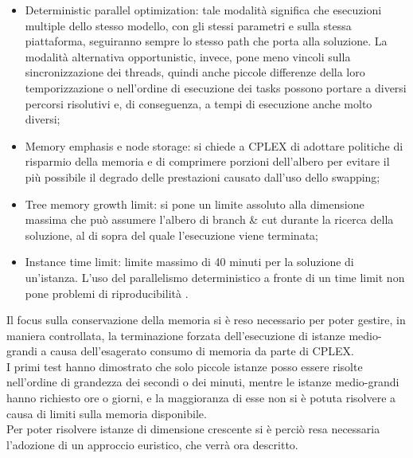 \begin{itemize}
	\item Deterministic parallel optimization: tale modalità significa che esecuzioni multiple dello stesso modello, con gli stessi parametri e sulla stessa piattaforma, seguiranno sempre lo stesso path che porta alla soluzione. La modalità alternativa opportunistic, invece, pone meno vincoli sulla sincronizzazione dei threads, quindi anche piccole differenze della loro temporizzazione o nell'ordine di esecuzione dei tasks possono portare a diversi percorsi risolutivi e, di conseguenza, a tempi di esecuzione anche molto diversi; 
	\item Memory emphasis e node storage: si chiede a CPLEX di adottare politiche di risparmio della memoria e di comprimere  porzioni dell'albero per evitare il più possibile il degrado delle prestazioni causato dall'uso dello swapping;  
	\item Tree memory growth limit: si pone un limite assoluto alla dimensione massima che può assumere l'albero di branch \& cut durante la ricerca della soluzione, al di sopra del quale l'esecuzione viene terminata;
	\item Instance time limit: limite massimo di 40 minuti per la soluzione di un'istanza. L'uso del parallelismo deterministico a fronte di un time limit non pone problemi di riproducibilità \cite{cplex2015man} .
\end{itemize} 
Il focus sulla conservazione della memoria si è reso necessario per poter gestire, in maniera controllata, la terminazione forzata dell'esecuzione di istanze medio-grandi a causa dell'esagerato consumo di memoria da parte di CPLEX. \\
I primi test hanno dimostrato che solo piccole istanze posso essere risolte nell'ordine di grandezza dei secondi o dei minuti, mentre le istanze medio-grandi hanno richiesto ore o giorni, e la maggioranza di esse non si è potuta risolvere a causa di limiti sulla memoria disponibile. \\
Per poter risolvere istanze di dimensione crescente si è perciò resa necessaria l'adozione di un approccio euristico, che verrà ora descritto.\\

